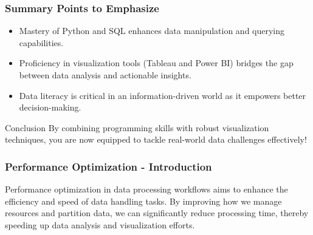 \documentclass{beamer}
\begin{document}
\begin{frame}
    \frametitle{Summary Points to Emphasize}
    \begin{itemize}
        \item Mastery of Python and SQL enhances data manipulation and querying capabilities.
        \item Proficiency in visualization tools (Tableau and Power BI) bridges the gap between data analysis and actionable insights.
        \item Data literacy is critical in an information-driven world as it empowers better decision-making.
    \end{itemize}
    
    \begin{block}{Conclusion}
        By combining programming skills with robust visualization techniques, you are now equipped to tackle real-world data challenges effectively!
    \end{block}
\end{frame}

\begin{frame}[fragile]
    \frametitle{Performance Optimization - Introduction}
    Performance optimization in data processing workflows aims to enhance the efficiency and speed of data handling tasks. 
    By improving how we manage resources and partition data, we can significantly reduce processing time, thereby speeding up data analysis and visualization efforts.
\end{frame}
\end{document}
